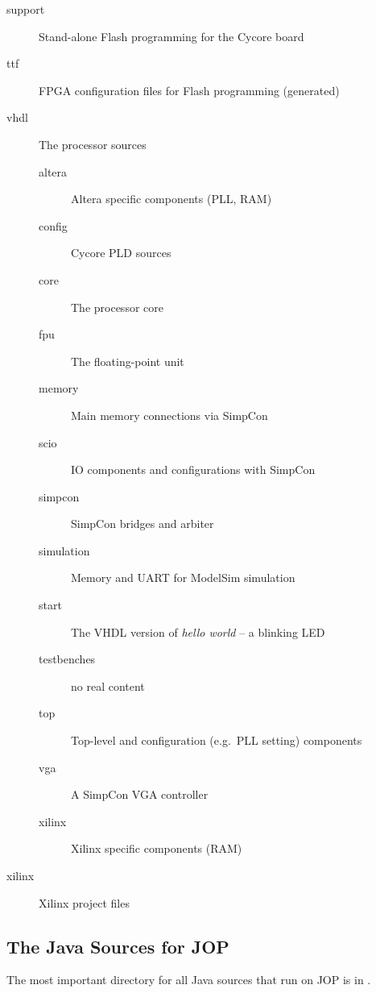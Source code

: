 \begin{description}
    \item[support] Stand-alone Flash programming for the Cycore board
    \item[ttf] FPGA configuration files for Flash programming (generated)
    \item[vhdl] The processor sources
    \begin{description}
        \item[altera] Altera specific components (PLL, RAM)
        \item[config] Cycore PLD sources
        \item[core] The processor core
        \item[fpu] The floating-point unit
        \item[memory] Main memory connections via SimpCon
        \item[scio] IO components and configurations with SimpCon
        \item[simpcon] SimpCon bridges and arbiter
        \item[simulation] Memory and UART for ModelSim simulation
        \item[start] The VHDL version of \emph{hello world} -- a blinking
        LED
        \item[testbenches] no real content
        \item[top] Top-level and configuration (e.g.\ PLL setting) components
        \item[vga] A SimpCon VGA controller
        \item[xilinx] Xilinx specific components (RAM)
    \end{description}
    \item[xilinx] Xilinx project files
\end{description}

\subsection{The Java Sources for JOP}

The most important directory for all Java sources that run on JOP is
in .


